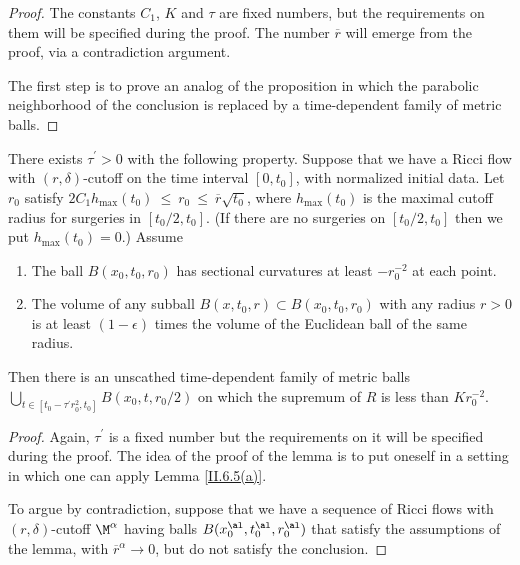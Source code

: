 \begin{proof}
The constants $C_1$, $K$ and $\tau$ are fixed numbers, but the
requirements on them will
be specified during the proof. The number $\overline{r}$ will emerge
from the proof, via a contradiction argument.

The first step is to prove an analog of the proposition in which
the parabolic neighborhood of the conclusion is replaced by
a time-dependent family of metric balls.

\end{proof}
\begin{lemma}
  \label{lem:kl-earlier-scalar-curvature-bounds-smaller-balls-from-lower-curvature-bound-existence-scalar-curvature-6}
 \label{extra}
There exists $\tau^\prime > 0$
with the
following property. Suppose that we have a Ricci flow with $(r, \delta)$-cutoff
on the time interval $[0, t_0]$, with normalized initial data.  Let
$r_0$ satisfy
$2C_1 h_{\max}(t_0) \: \le \: r_0 \: \le \: \overline{r} \sqrt{t_0}$,
where $h_{\max}(t_0)$ is the maximal cutoff radius for surgeries in
$[t_0/2, t_0]$. (If there are no surgeries on $[t_0/2, t_0]$ then we put
$h_{\max}(t_0) = 0$.)
Assume
\begin{enumerate}
\item The ball $B(x_0, t_0, r_0)$ has sectional curvatures at least $- r_0^{-2}$
at each point.
\item The volume of any subball $B(x, t_0, r) \subset B(x_0, t_0, r_0)$ with
any radius $r > 0$ is at least $(1-\epsilon)$ times the volume of the
Euclidean ball of the same radius.
\end{enumerate}

Then there is an unscathed time-dependent family
of metric balls
$\bigcup_{t \in [t_0-\tau^\prime r_0^2, t_0]} B(x_0, t, r_0/2)$
on which the supremum of $R$ is less than $K r_0^{-2}$.
\end{lemma}
\begin{proof}
Again, $\tau^\prime$ is a fixed number but the
requirements on it will
be specified during the proof.
The idea of the proof of the lemma
is to put oneself in a setting in
which one can apply Lemma \ref{II.6.5(a)}.

To argue by contradiction,
suppose that we have a sequence of
Ricci flows with $(r, \delta)$-cutoff $\M^\alpha$ having
balls $B(x_0^\al, t_0^\al, r_0^\al)$ that
satisfy the assumptions of the lemma, with $\overline{r}^\alpha
\rightarrow 0$, but do not satisfy the conclusion.

\end{proof}
